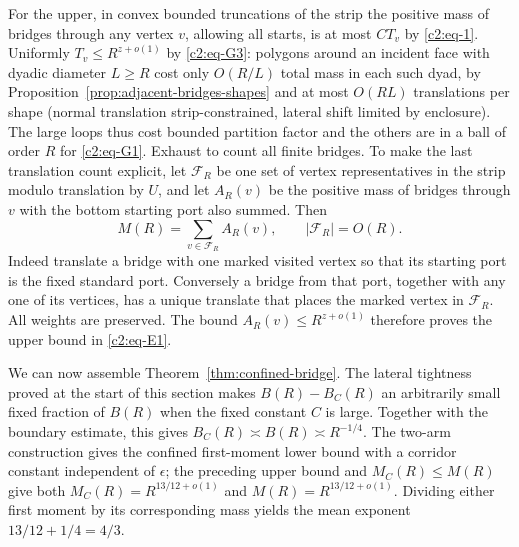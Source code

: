 For the upper, in convex bounded truncations of the strip the positive mass of bridges through any vertex \(v\), allowing all starts, is at most \(C T_v\) by \eqref{c2:eq-1}. Uniformly \(T_v\le R^{z+o(1)}\) by \eqref{c2:eq-G3}: polygons around an incident face with dyadic diameter \(L\ge R\) cost only \(O(R/L)\) total mass in each such dyad, by Proposition~\ref{prop:adjacent-bridges-shapes} and at most \(O(RL)\) translations per shape (normal translation strip-constrained, lateral shift limited by enclosure). The large loops thus cost bounded partition factor and the others are in a ball of order \(R\) for \eqref{c2:eq-G1}. Exhaust to count all finite bridges. To make the last translation count explicit, let \(\mathcal F_R\) be
one set of vertex representatives in the strip modulo translation by
\(U\), and let \(A_R(v)\) be the positive mass of bridges through \(v\)
with the bottom starting port also summed. Then
\[
 M(R)=\sum_{v\in\mathcal F_R}A_R(v),\qquad |\mathcal F_R|=O(R).
\]
Indeed translate a bridge with one marked visited vertex so that its
starting port is the fixed standard port. Conversely a bridge from that
port, together with any one of its vertices, has a unique translate that
places the marked vertex in \(\mathcal F_R\). All weights are preserved.
The bound \(A_R(v)\le R^{z+o(1)}\) therefore proves the upper bound in
\eqref{c2:eq-E1}.



We can now assemble Theorem~\ref{thm:confined-bridge}. The lateral tightness
proved at the start of this section makes \(B(R)-B_C(R)\) an arbitrarily
small fixed fraction of \(B(R)\) when the fixed constant \(C\) is large.
Together with the boundary estimate, this gives
\(B_C(R)\asymp B(R)\asymp R^{-1/4}\). The two-arm construction gives the
confined first-moment lower bound with a corridor constant independent of
\(\epsilon\); the preceding upper bound and \(M_C(R)\le M(R)\) give
both \(M_C(R)=R^{13/12+o(1)}\) and \(M(R)=R^{13/12+o(1)}\). Dividing either first moment by
its corresponding mass yields the mean exponent \(13/12+1/4=4/3\).
